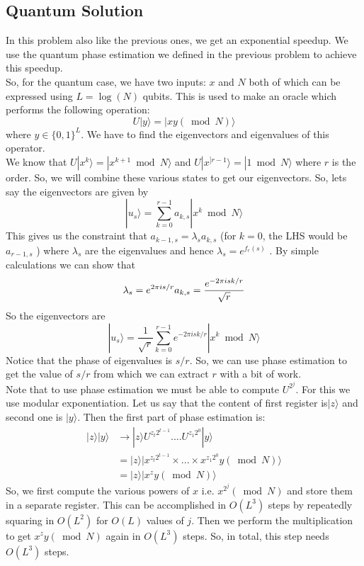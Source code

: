\subsection{Quantum Solution}
In this problem also like the previous ones, we get an exponential speedup. We use the quantum phase estimation we defined in the previous problem to achieve this speedup.\\
So, for the quantum case, we have two inputs: $x$ and $N$ both of which can be expressed using $L = \log(N)$ qubits. This is used to make an oracle which performs the following operation:
\begin{equation}
U|y\rangle = |xy(\bmod N)\rangle
\end{equation}where $y \in \{ 0,1 \}^L$. We have to find the eigenvectors and eigenvalues of this operator. \\
We know that $U|x^k\rangle = |x^{k+1} \bmod N \rangle$ and $U|x^{]r-1}\rangle = |1\bmod N \rangle$ where $r$ is the order. So, we will combine these various states to get our eigenvectors. So, lets say the eigenvectors are given by  
\begin{equation}
|u_s\rangle = \sum_{k=0}^{r-1} a_{k,s} |x^k \bmod N \rangle 
\end{equation}
This gives us the constraint that $a_{k-1,s} = \lambda_s a_{k,s}$ (for $k=0$, the LHS would be $a_{r-1,s}$ ) where $\lambda_s$ are the eigenvalues and hence $\lambda_s = e^{f_r(s)}$ . By simple calculations we can show that
\begin{equation}
\lambda_s = e^{2\pi is/r} \\
a_{k,s} = \frac{e^{-2\pi isk/r}}{\sqrt{r}} 
\end{equation}So the eigenvectors are 
\begin{equation}
|u_s\rangle = \frac{1}{\sqrt{r}} \sum_{k=0}^{r-1} e^{-2\pi isk/r} |x^k \bmod N \rangle 
\end{equation}Notice that the phase of eigenvalues is $s/r$. So, we can use phase estimation to get the value of $s/r$ from which we can extract $r$ with a bit of work.\\
Note that to use phase estimation we must be able to compute $U^{2^j}$. For this we use modular exponentiation. Let us say that the content of first register is$|z\rangle$ and second one is $|y\rangle$. Then the first part of phase estimation is:
\begin{equation}
\begin{split}
|z\rangle |y\rangle & \rightarrow |z\rangle U^{z_t 2^{t-1}} .... U^{z_1 2^0} |y\rangle
\\ &= |z\rangle | x^{z_t 2^{t-1}} \times ... \times x^{z_1 2^0} y (\bmod N) \rangle
\\ & = |z\rangle |x^{z} y (\bmod N) \rangle
\end{split}
\end{equation}So, we first compute the various powers of $x$ i.e. $x^{2^j} (\bmod N)$ and store them in a separate register. This can be accomplished in $O(L^3)$ steps by repeatedly squaring in $O(L^2)$ for $O(L)$ values of $j$. Then we perform the multiplication to get $x^z y (\bmod N)$ again in $O(L^3)$ steps. So, in total, this step needs $O(L^3)$ steps.\\
